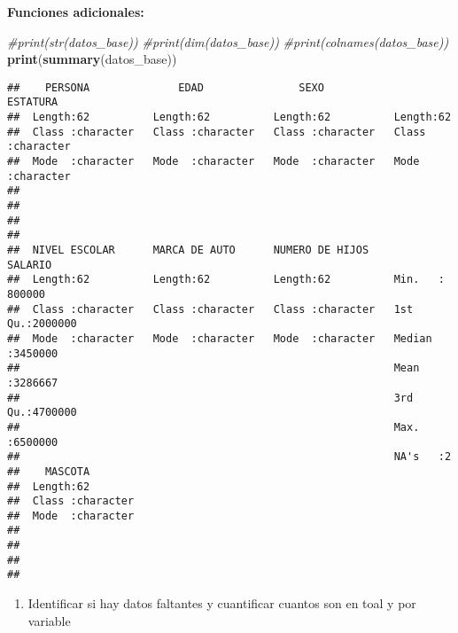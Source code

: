 \documentclass[
]{article}
\newenvironment{Shaded}{\begin{snugshade}}{\end{snugshade}}
\newcommand{\CommentTok}[1]{\textcolor[rgb]{0.56,0.35,0.01}{\textit{#1}}}
\newcommand{\FunctionTok}[1]{\textcolor[rgb]{0.13,0.29,0.53}{\textbf{#1}}}
\newcommand{\NormalTok}[1]{#1}
\providecommand{\tightlist}{%
  \setlength{\itemsep}{0pt}\setlength{\parskip}{0pt}}
\begin{document}
\textbf{Funciones adicionales:}

\begin{Shaded}
\begin{Highlighting}[]
\CommentTok{\#print(str(datos\_base))}
\CommentTok{\#print(dim(datos\_base))}
\CommentTok{\#print(colnames(datos\_base))}
\FunctionTok{print}\NormalTok{(}\FunctionTok{summary}\NormalTok{(datos\_base))}
\end{Highlighting}
\end{Shaded}

\begin{verbatim}
##    PERSONA              EDAD               SEXO             ESTATURA        
##  Length:62          Length:62          Length:62          Length:62         
##  Class :character   Class :character   Class :character   Class :character  
##  Mode  :character   Mode  :character   Mode  :character   Mode  :character  
##                                                                             
##                                                                             
##                                                                             
##                                                                             
##  NIVEL ESCOLAR      MARCA DE AUTO      NUMERO DE HIJOS       SALARIO       
##  Length:62          Length:62          Length:62          Min.   : 800000  
##  Class :character   Class :character   Class :character   1st Qu.:2000000  
##  Mode  :character   Mode  :character   Mode  :character   Median :3450000  
##                                                           Mean   :3286667  
##                                                           3rd Qu.:4700000  
##                                                           Max.   :6500000  
##                                                           NA's   :2        
##    MASCOTA         
##  Length:62         
##  Class :character  
##  Mode  :character  
##                    
##                    
##                    
## 
\end{verbatim}

\begin{enumerate}
\def\labelenumi{\alph{enumi}.}
\setcounter{enumi}{4}
\tightlist
\item
  Identificar si hay datos faltantes y cuantificar cuantos son en toal y
  por variable
\end{enumerate}
\end{document}

